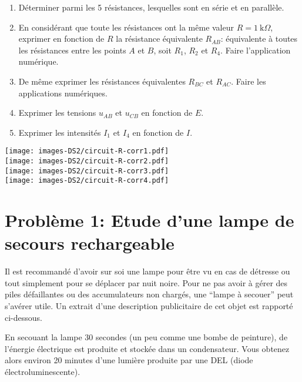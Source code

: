 \begin{enumerate}
\def\labelenumi{\arabic{enumi}.}
\item
  Déterminer parmi les 5 résistances, lesquelles sont en série et en
  parallèle.
\item
  En considérant que toute les résistances ont la même valeur
  \(R=1\ \mathrm{k}\Omega\), exprimer en fonction de \(R\) la résistance
  équivalente \(R_{AB}\): équivalente à toutes les résistances entre les
  points \(A\) et \(B\), soit \(R_1\), \(R_2\) et \(R_4\). Faire
  l'application numérique.
\item
  De même exprimer les résistances équivalentes \(R_{BC}\) et
  \(R_{AC}\). Faire les applications numériques.
\item
  Exprimer les tensions \(u_{AB}\) et \(u_{CB}\) en fonction de \(E\).
\item
  Exprimer les intensités \(I_1\) et \(I_4\) en fonction de \(I\).
\end{enumerate}

\newpage

\texttt{[image: images-DS2/circuit-R-corr1.pdf]}\\
\texttt{[image: images-DS2/circuit-R-corr2.pdf]}\\
\texttt{[image: images-DS2/circuit-R-corr3.pdf]}\\
\texttt{[image: images-DS2/circuit-R-corr4.pdf]}

\hypertarget{probluxe8me-1-etude-dune-lampe-de-secours-rechargeable}{%
\section*{Problème 1: Etude d'une lampe de secours
rechargeable}\label{probluxe8me-1-etude-dune-lampe-de-secours-rechargeable}}

Il est recommandé d'avoir sur soi une lampe pour être vu en cas de
détresse ou tout simplement pour se déplacer par nuit noire. Pour ne pas
avoir à gérer des piles défaillantes ou des accumulateurs non chargés,
une ``lampe à secouer'' peut s'avérer utile. Un extrait d'une
description publicitaire de cet objet est rapporté ci-dessous.

En secouant la lampe 30 secondes (un peu comme une bombe de peinture),
de l'énergie électrique est produite et stockée dans un condensateur.
Vous obtenez alors environ 20 minutes d'une lumière produite par une DEL
(diode électroluminescente).

